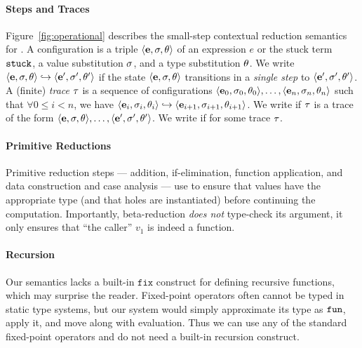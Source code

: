 \paragraph{Steps and Traces}

%
Figure~\ref{fig:operational} describes the small-step contextual
reduction semantics for \lang.
%
A configuration is a triple $\langle \mathbf{e}, \sigma, \theta \rangle$ of an
expression $e$ or the stuck term $\mathtt{stuck}$, a value substitution $\sigma$,
and a type substitution $\theta$.
%
%
We write $\langle \mathbf{e}, \sigma, \theta \rangle \hookrightarrow \langle \mathbf{e}', \sigma', \theta' \rangle$ if the state
$\langle \mathbf{e}, \sigma, \theta \rangle$ transitions in a \emph{single step} to
$\langle \mathbf{e}', \sigma', \theta' \rangle$.
%
A (finite) \emph{trace} $\tau$ is a sequence of configurations
$\langle \mathbf{e}_0, \sigma_0, \theta_0 \rangle, \ldots, \langle \mathbf{e}_n, \sigma_n, \theta_n \rangle$ such that
$\forall 0 \leq i < n$, we have
$\langle \mathbf{e}_i, \sigma_i, \theta_i \rangle \hookrightarrow \langle \mathbf{e}_{i+1}, \sigma_{i+1}, \theta_{i+1} \rangle$.
%
We write  if $\tau$ is
a trace of the form $\langle \mathbf{e}, \sigma, \theta \rangle,\ldots,\langle \mathbf{e}', \sigma', \theta' \rangle$.
%
We write  if
 for some trace $\tau$.

\paragraph{Primitive Reductions}
%
%
Primitive reduction steps --- addition, if-elimination,
function application, and data construction and case
analysis --- use \forcesym to ensure that values have
the appropriate type (and that holes are instantiated)
before continuing the computation.
%
Importantly, beta-reduction \emph{does not} type-check its
argument, it only ensures that ``the caller'' $v_1$ is indeed
a function.

\paragraph{Recursion}
%
Our semantics lacks a built-in $\mathtt{fix}$ construct
for defining recursive functions, which may surprise
the reader.
%
Fixed-point operators often cannot be typed in static type
systems, but our system would simply approximate its type
as $\mathtt{fun}$, apply it, and move along with evaluation.
%
Thus we can use any of the standard fixed-point operators
and do not need a built-in recursion construct. 

